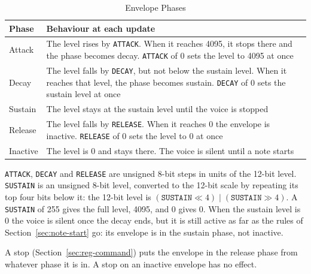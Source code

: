 \begin{table}[H]
	\centering
	\begin{tabular}{lp{9cm}}
		\toprule
		\textbf{Phase} & \textbf{Behaviour at each update}                                                                                                                                             \\
		\midrule
		Attack         & The level rises by \texttt{ATTACK}. When it reaches 4095, it stops there and the phase becomes decay. \texttt{ATTACK} of 0 sets the level to 4095 at once                     \\
		Decay          & The level falls by \texttt{DECAY}, but not below the sustain level. When it reaches that level, the phase becomes sustain. \texttt{DECAY} of 0 sets the sustain level at once \\
		Sustain        & The level stays at the sustain level until the voice is stopped                                                                                                               \\
		Release        & The level falls by \texttt{RELEASE}. When it reaches 0 the envelope is inactive. \texttt{RELEASE} of 0 sets the level to 0 at once                                            \\
		Inactive       & The level is 0 and stays there. The voice is silent until a note starts                                                                                                       \\
		\bottomrule
	\end{tabular}
	\caption{Envelope Phases}
	\label{tab:envelope-phases}
\end{table}

\texttt{ATTACK}, \texttt{DECAY} and \texttt{RELEASE} are unsigned 8-bit steps in units of the 12-bit level. \texttt{SUSTAIN}
is an unsigned 8-bit level, converted to the 12-bit scale by repeating its top four bits below it: the 12-bit level is
$(\texttt{SUSTAIN} \ll 4) \mathbin{|} (\texttt{SUSTAIN} \gg 4)$. A \texttt{SUSTAIN} of 255 gives the full level, 4095, and 0
gives 0. When the sustain level is 0 the voice is silent once the decay ends, but it is still active as far as the rules of Section~\ref{sec:note-start} go: its envelope is in the sustain phase, not inactive.

A stop (Section~\ref{sec:reg-command}) puts the envelope in the release phase from whatever phase it is in. A stop on
an inactive envelope has no effect.

